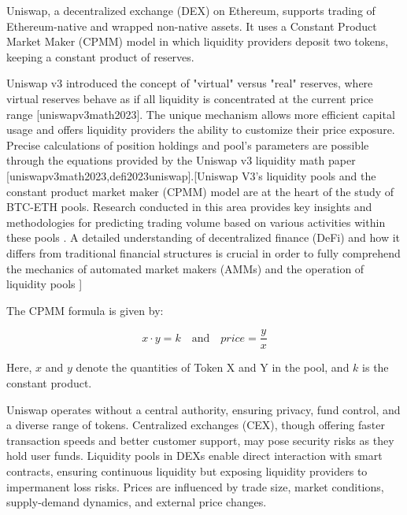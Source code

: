 \documentclass{article}
\begin{document}
Uniswap, a decentralized exchange (DEX) on Ethereum, supports trading of Ethereum-native and wrapped non-native assets. It uses a Constant Product Market Maker (CPMM) model in which liquidity providers deposit two tokens, keeping a constant product of reserves\cite{defipaper2023, risksreturns2023,defi2023uniswap}.

Uniswap v3 introduced the concept of "virtual" versus "real" reserves, where virtual reserves behave as if all liquidity is concentrated at the current price range [uniswapv3math2023]. The unique mechanism allows more efficient capital usage and offers liquidity providers the ability to customize their price exposure. Precise calculations of position holdings and pool's parameters are possible through the equations provided by the Uniswap v3 liquidity math paper [uniswapv3math2023,defi2023uniswap].[Uniswap V3's liquidity pools and the constant product market maker (CPMM) model are at the heart of the study of BTC-ETH pools. Research conducted in this area provides key insights and methodologies for predicting trading volume based on various activities within these pools \cite{defi2023uniswap}. A detailed understanding of decentralized finance (DeFi) and how it differs from traditional financial structures is crucial in order to fully comprehend the mechanics of automated market makers (AMMs) and the operation of liquidity pools \cite{makarov2021cryptocurrencies}]

The CPMM formula is given by:

\[x \cdot y = k \quad \text{and} \quad price = \frac{y}{x}\]

Here, \(x\) and \(y\) denote the quantities of Token X and Y in the pool, and \(k\) is the constant product\cite{makarov2021cryptocurrencies,defi2023uniswap}.

Uniswap operates without a central authority, ensuring privacy, fund control, and a diverse range of tokens\cite{defi2023uniswap}. Centralized exchanges (CEX), though offering faster transaction speeds and better customer support, may pose security risks as they hold user funds\cite{makarov2021cryptocurrencies}. Liquidity pools in DEXs enable direct interaction with smart contracts, ensuring continuous liquidity but exposing liquidity providers to impermanent loss risks\cite{impermanentloss2023, risksreturns2023}. Prices are influenced by trade size, market conditions, supply-demand dynamics, and external price changes\cite{defi-characterisation-2023,risks_returns_uniswap,defi2023uniswap}.

\pagebreak
\end{document}
